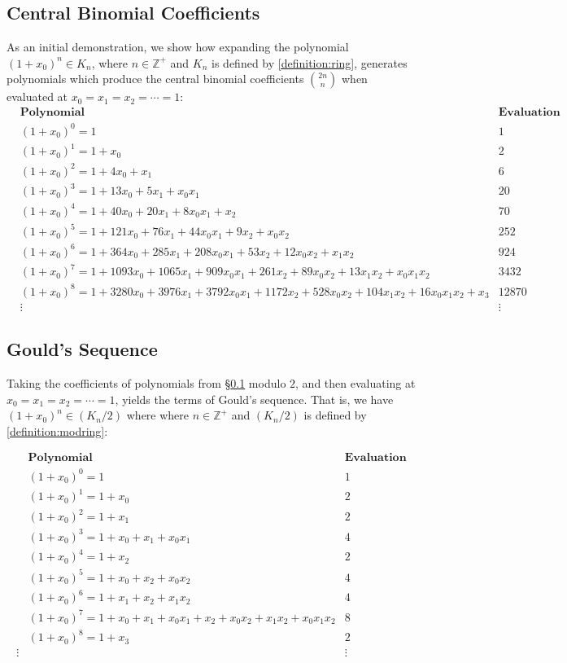 \documentclass{article}
\theoremstyle{plain}
\theoremstyle{definition}
\newcommand{\Z}{\mathbb{Z}}
\newcommand{\K}{K}
\begin{document}
\subsection{Central Binomial Coefficients} \label{section:demonstrations:cbc}
As an initial demonstration, we show how expanding the polynomial $(1+x_0)^n \in \K_n$, where $n \in \Z^+$ and $\K_n$ is defined by \cref{definition:ring}, generates polynomials which produce the central binomial coefficients $ \binom{2n}{n} $ when evaluated at $x_0=x_1=x_2=\cdots=1$:
\small
\begin{align*}
& \textbf{Polynomial} & \textbf{Evaluation}\\ 
& (1+x_0)^0 = 1 & 1 \\
& (1+x_0)^1 = 1+x_0 & 2 \\
& (1+x_0)^2 = 1+4x_0+x_1 & 6 \\
& (1+x_0)^3 = 1+13x_0+5x_1+x_0x_1 & 20 \\
& (1+x_0)^4 = 1+40x_0+20x_1+8x_0x_1+x_2 & 70 \\
& (1+x_0)^5 = 1+121x_0+76x_1+44x_0x_1+9x_2+x_0x_2 & 252 \\
& (1+x_0)^6 = 1+364x_0+285x_1+208x_0x_1+53x_2+12x_0x_2+x_1x_2 & 924 \\
& (1+x_0)^7 = 1+1093x_0+1065x_1+909x_0x_1+261x_2+89x_0x_2+13x_1x_2+x_0x_1x_2 & 3432 \\
& (1+x_0)^8 = 1+3280x_0+3976x_1+3792x_0x_1+1172x_2+528x_0x_2+104x_1x_2+16x_0x_1x_2+x_3 & 12870 \\
& \vdots & \vdots
\end{align*}
\normalsize

\subsection{Gould's Sequence}
Taking the coefficients of polynomials from \S\ref{section:demonstrations:cbc} modulo $2$, and then evaluating at $x_0=x_1=x_2=\cdots=1$, yields the terms of Gould's sequence. That is, we have $(1+x_0)^n \in (\K_n/2) $ where where $n \in \Z^+$ and $(\K_n/2)$ is defined by \cref{definition:modring}:

\small
\begin{align*}
& \textbf{Polynomial} & \textbf{Evaluation}\\ 
& (1+x_0)^0 = 1 & 1 \\
& (1+x_0)^1 = 1+x_0 & 2 \\
& (1+x_0)^2 = 1+x_1 & 2 \\
& (1+x_0)^3 = 1+x_0+x_1+x_0x_1 & 4 \\
& (1+x_0)^4 = 1+x_2 & 2 \\
& (1+x_0)^5 = 1+x_0+x_2+x_0x_2 & 4 \\
& (1+x_0)^6 = 1+x_1+x_2+x_1x_2 & 4 \\
& (1+x_0)^7 = 1+x_0+x_1+x_0x_1+x_2+x_0x_2+x_1x_2+x_0x_1x_2 & 8 \\
& (1+x_0)^8 = 1+x_3 & 2 \\
\vdots & & \vdots
\end{align*}
\normalsize
\end{document}
